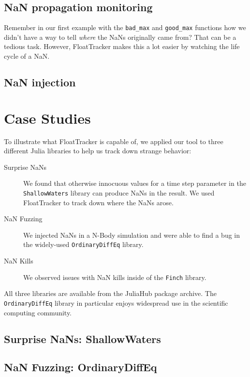 \documentclass{juliacon}
\begin{document}
\subsection{NaN propagation monitoring}

Remember in our first example with the \texttt{bad\_max} and \texttt{good\_max} functions how we didn't have a way to tell \emph{where} the NaNs originally came from?
That can be a tedious task.
However, FloatTracker makes this a lot easier by watching the life cycle of a NaN.


\subsection{NaN injection}

\section{Case Studies}

To illustrate what FloatTracker is capable of, we applied our tool to three different Julia libraries to help us track down strange behavior:

\begin{description}
\item[Surprise NaNs] We found that otherwise innocuous values for a time step parameter in the \texttt{ShallowWaters} library can produce NaNs in the result.
  We used FloatTracker to track down where the NaNs arose.
\item[NaN Fuzzing] We injected NaNs in a N-Body simulation and were able to find a bug in the widely-used \texttt{OrdinaryDiffEq} library.
\item[NaN Kills] We observed issues with NaN kills inside of the \texttt{Finch} library.
\end{description}

All three libraries are available from the JuliaHub package archive.
The \texttt{OrdinaryDiffEq} library in particular enjoys widespread use in the scientific computing community.

\subsection{Surprise NaNs: ShallowWaters}

\subsection{NaN Fuzzing: OrdinaryDiffEq}
\end{document}
